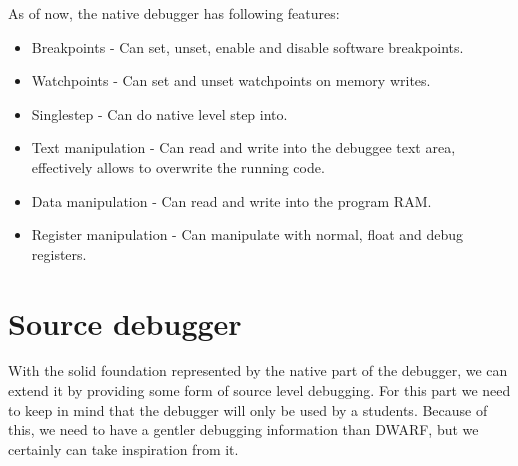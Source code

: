 As of now, the native debugger has following features:
\begin{itemize}
    \item Breakpoints - Can set, unset, enable and disable software breakpoints.
    \item Watchpoints - Can set and unset watchpoints on memory writes.
    \item Singlestep - Can do native level step into.
    \item Text manipulation - Can read and write into the debuggee text area,
        effectively allows to overwrite the running code.
    \item Data manipulation - Can read and write into the program RAM.
    \item Register manipulation - Can manipulate with normal, float and debug registers.
\end{itemize}

\section{Source debugger}
With the solid foundation represented by the native part of the debugger, we
can extend it by providing some form of source level debugging. For this part
we need to keep in mind that the debugger will only be used by a students.
Because of this, we need to have a gentler debugging information than DWARF,
but we certainly can take inspiration from it.
